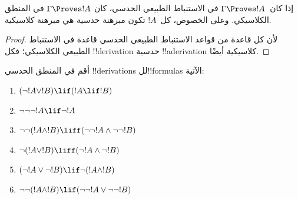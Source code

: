\documentclass[../../../include/open-logic-section]{subfiles}
\begin{document}
\begin{prop}
  إذا كان~$\Gamma \Proves !A$ في الاستنباط الطبيعي الحدسي، كان
  $\Gamma \Proves !A$ في المنطق الكلاسيكي. وعلى الخصوص، كل~$!A$
  تكون مبرهنة حدسية هي مبرهنة كلاسيكية.
\end{prop}

\begin{proof}
  لأن كل قاعدة من قواعد الاستنباط الطبيعي الحدسي قاعدة في الاستنباط
  الطبيعي الكلاسيكي؛ فكل !!{derivation} حدسية !!a{derivation}
  كلاسيكية أيضًا.
\end{proof}

\begin{prob}
  أقم في المنطق الحدسي !!{derivation}s لل!!{formula}s الآتية:
  \begin{enumerate}
    \item $(\lnot !A \lor !B) \lif (!A \lif !B)$
    \item $\lnot\lnot\lnot !A \lif \lnot !A$
    \item $\lnot\lnot (!A \land !B) \liff (\lnot\lnot !A\land \lnot \lnot !B)$
    \item $\lnot (!A \lor !B) \liff (\lnot !A \land \lnot !B)$
    \item $(\lnot !A \lor \lnot !B) \lif \lnot (!A \land !B)$
    \item $\lnot\lnot ( !A \land !B) \lif  (\lnot\lnot !A \lor
    \lnot\lnot !B)$
  \end{enumerate}
\end{prob}
\end{document}

